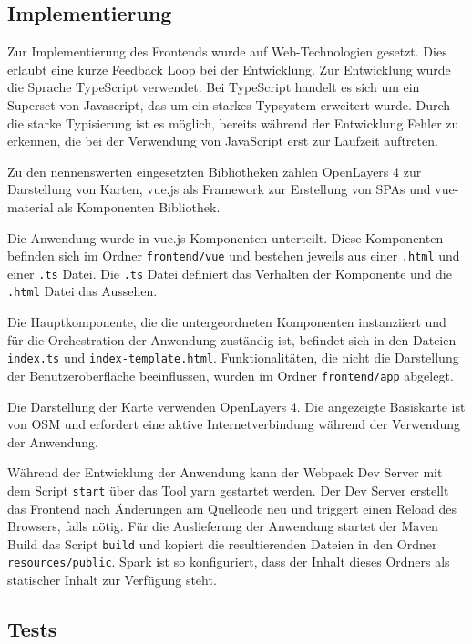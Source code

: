 \documentclass[
ngerman          %
,a4paper          %
,11pt
,pdftex
]{report}
\begin{document}
\subsection{Implementierung}

Zur Implementierung des Frontends wurde auf Web-Technologien gesetzt. Dies erlaubt eine kurze Feedback Loop bei der Entwicklung. Zur Entwicklung wurde die Sprache TypeScript verwendet. Bei TypeScript handelt es sich um ein Superset von Javascript, das um ein starkes Typsystem erweitert wurde. Durch die starke Typisierung ist es möglich, bereits während der Entwicklung Fehler zu erkennen, die bei der Verwendung von JavaScript erst zur Laufzeit auftreten.

Zu den nennenswerten eingesetzten Bibliotheken zählen OpenLayers 4 zur Darstellung von Karten, vue.js als Framework zur Erstellung von \acp{SPA} und vue-material als Komponenten Bibliothek.

Die Anwendung wurde in vue.js Komponenten unterteilt. Diese Komponenten befinden sich im Ordner \texttt{frontend/vue} und bestehen jeweils aus einer \texttt{.html} und einer \texttt{.ts} Datei. Die \texttt{.ts} Datei definiert das Verhalten der Komponente und die \texttt{.html} Datei das Aussehen.

Die Hauptkomponente, die die untergeordneten Komponenten instanziiert und für die Orchestration der Anwendung zuständig ist, befindet sich in den Dateien \texttt{index.ts} und \texttt{index-template.html}. Funktionalitäten, die nicht die Darstellung der Benutzeroberfläche beeinflussen, wurden im Ordner \texttt{frontend/app} abgelegt.

Die Darstellung der Karte verwenden OpenLayers 4. Die angezeigte Basiskarte ist von \ac{OSM} und erfordert eine aktive Internetverbindung während der Verwendung der Anwendung.

Während der Entwicklung der Anwendung kann der Webpack Dev Server mit dem Script \texttt{start} über das Tool yarn gestartet werden. Der Dev Server erstellt das Frontend nach Änderungen am Quellcode neu und triggert einen Reload des Browsers, falls nötig. Für die Auslieferung der Anwendung startet der Maven Build das Script \texttt{build} und kopiert die resultierenden Dateien in den Ordner \texttt{resources/public}. Spark ist so konfiguriert, dass der Inhalt dieses Ordners als statischer Inhalt zur Verfügung steht.

\subsection{Tests}
\end{document}

